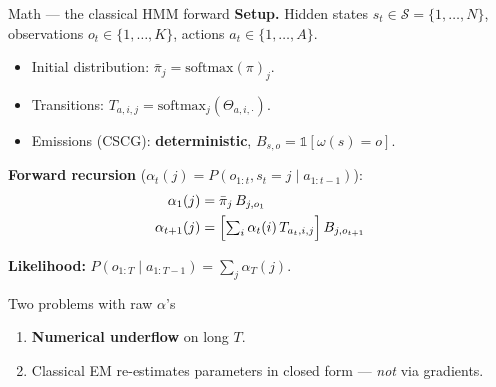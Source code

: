 \documentclass[aspectratio=169,10pt]{beamer}
\begin{document}
\begin{frame}{Math --- the classical HMM forward}
  \textbf{Setup.}\; Hidden states $s_t \in \mathcal{S}=\{1,\dots,N\}$,
  observations $o_t \in \{1,\dots,K\}$, actions $a_t \in \{1,\dots,A\}$.
  \begin{itemize}
    \item Initial distribution: $\bar\pi_j = \mathrm{softmax}(\pi)_j$.
    \item Transitions: $T_{a,i,j} = \mathrm{softmax}_j(\Theta_{a,i,\cdot})$.
    \item Emissions (CSCG): \textbf{deterministic}, $B_{s,o}=\mathbb{1}[\omega(s)=o]$.
  \end{itemize}

  \vspace{0.3em}
  \textbf{Forward recursion} ($\alpha_t(j) = P(o_{1:t}, s_t = j \mid a_{1:t-1})$):
  \begin{align*}
    \alpha_1(j) &= \bar\pi_j\, B_{j,o_1}\\
    \alpha_{t+1}(j) &= \Bigl[\textstyle\sum_i \alpha_t(i)\, T_{a_t,i,j}\Bigr]\, B_{j,o_{t+1}}
  \end{align*}

  \vspace{0.2em}
  \textbf{Likelihood:}\quad
  $P(o_{1:T} \mid a_{1:T-1}) = \sum_j \alpha_T(j)$.

  \vspace{0.6em}
  \begin{block}{Two problems with raw $\alpha$'s}
    \begin{enumerate}
      \item \textbf{Numerical underflow} on long $T$.
      \item Classical EM re-estimates parameters in closed form ---
            \emph{not} via gradients.
    \end{enumerate}
  \end{block}
\end{frame}
\end{document}

